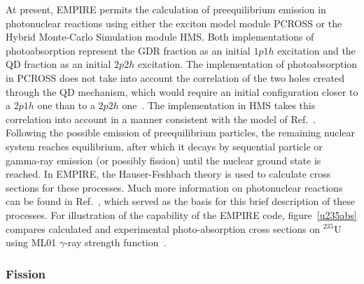 \documentclass[twocolumn,amsmath,amssymb,10pt,groupedaddress,a4paper]{revtex4}
\begin{document}
 At present, EMPIRE permits the calculation of
preequilibrium emission in photonuclear reactions using either the
exciton model module PCROSS or the Hybrid Monte-Carlo
Simulation module HMS. Both implementations of photoabsorption
represent the GDR fraction as an initial $1p1h$ excitation and the
QD fraction as an initial $2p2h$ excitation. The implementation of
photoabsorption in PCROSS does not take into account the correlation
of the two holes created through the QD mechanism, which would require
an initial configuration closer to a $2p1h$ one than to a $2p2h$
one~\cite{PHNuc}. The implementation in HMS takes this correlation
into account in a manner consistent with the model of Ref.~\cite{chadQD}.
Following the possible emission of preequilibrium particles, the remaining
nuclear system reaches equilibrium, after which it decays by sequential
particle or gamma-ray emission (or possibly fission) until the nuclear
ground state is reached. In EMPIRE, the Hauser-Feshbach theory is
used to calculate cross sections for these processes.
Much more information on photonuclear reactions can be found in
Ref.~\cite{PHNuc}, which served as the basis for this brief description
of these processes.
For illustration of the capability of the EMPIRE code, figure~\ref{u235abs}
compares calculated and experimental photo-absorption
cross sections on $^{235}$U using ML01 $\gamma$-ray strength
function~\cite{mike2}.


\subsubsection{Fission}
\end{document}
